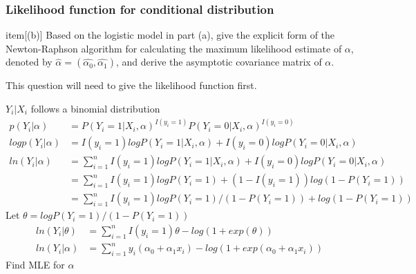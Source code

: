 \documentclass[11pt]{article} %
\begin{document}
	\subsubsection{Likelihood function for conditional distribution}
	item[(b)] Based on the logistic model in part (a), give the explicit form of the Newton-Raphson
	algorithm for calculating the maximum likelihood estimate of $\alpha$, denoted by $\hat{\alpha} =
	(\hat{\alpha_0}, \hat{\alpha_1})$, and derive the asymptotic covariance matrix of $\alpha$.
	
	This question will need to give the likelihood function first. 
	
	
	$Y_i|X_i$ follows a binomial distribution
	\begin{align*}
		p(Y_i|\alpha) &= P(Y_i=1 |X_i,\alpha)^{I(y_i=1)} P(Y_i=0 |X_i,\alpha)^{I(y_i=0)}\\
		log p(Y_i|\alpha) &= I(y_i=1) log P(Y_i=1 |X_i,\alpha) + I(y_i=0) log P(Y_i=0 |X_i,\alpha)\\
		ln (Y_i|\alpha) &= \sum_{i=1}^n I(y_i=1) log P(Y_i=1 |X_i,\alpha) + I(y_i=0) log P(Y_i=0 |X_i,\alpha)\\
		&= \sum_{i=1}^n I(y_i=1) log P(Y_i=1) + (1-I(y_i=1)) log (1-P(Y_i=1)) \\
		&= \sum_{i=1}^n I(y_i=1) log P(Y_i=1)/(1-P(Y_i=1)) + log (1-P(Y_i=1))
	\end{align*}
	Let $\theta = log P(Y_i=1)/(1-P(Y_i=1))$
	\begin{align*}
		ln (Y_i|\theta) &= \sum_{i=1}^n I(y_i=1) \theta - log (1 + exp(\theta) )\\
		ln (Y_i|\alpha) &= \sum_{i=1}^n y_i (\alpha_0 + \alpha_1 x_i) - log \left(1 + exp(\alpha_0 + \alpha_1 x_i) \right)
	\end{align*}    
	Find MLE for $\alpha$
\end{document}
